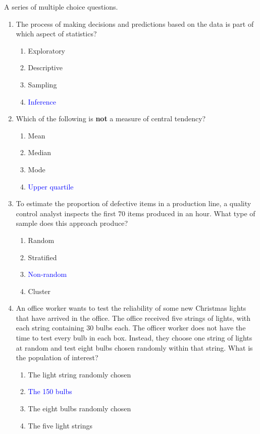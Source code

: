 \documentclass[11pt,a4paper]{article}
\begin{document}
A series of multiple choice questions. 
\begin{enumerate}
\item The process of making decisions and predictions based on the data is part of which aspect of statistics?

\begin{enumerate}
\item Exploratory
\item Descriptive
\item Sampling 
\item \textcolor{blue}{Inference}
\end{enumerate}

\item Which of the following is \textbf{not} a measure of central tendency?

\begin{enumerate}
\item Mean
\item Median
\item Mode
\item \textcolor{blue}{Upper quartile}
\end{enumerate}

\item To estimate the proportion of defective items in a production line, a quality control analyst inspects the first 70 items produced in an hour. What type of sample does this approach produce?

\begin{enumerate}
\item Random
\item Stratified
\item \textcolor{blue}{Non-random}
\item Cluster
\end{enumerate}



\item An office worker wants to test the reliability of some new Christmas lights that have arrived in the office. The office received five strings of lights, with each string containing 30 bulbs each. The officer worker does not have the time to test every bulb in each box. Instead, they choose one string of lights at random and test eight bulbs chosen randomly within that string. What is the population of interest?
\begin{enumerate}
\item The light string randomly chosen
\item \textcolor{blue}{The 150 bulbs}
\item The eight bulbs randomly chosen
\item The five light strings
\end{enumerate}


\end{enumerate}
\end{document}
